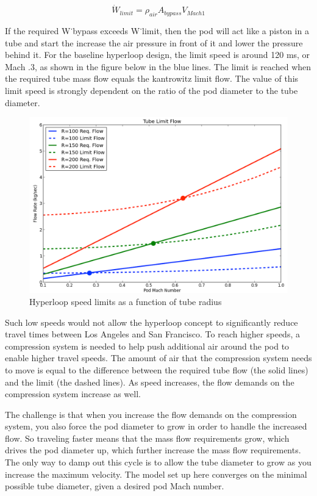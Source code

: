 \documentclass[heading.tex]{subfiles}
\begin{document}
\begin{equation*}
\dot{W}_{limit} = \rho_{air} A_{bypass} V_{Mach 1}
\end{equation*}


If the required W˙bypass exceeds W˙limit, then the pod will act like a piston in a tube and start the increase the air pressure in front of it and lower the pressure behind it. For the baseline hyperloop design, the limit speed is around 120 ms, or Mach .3, as shown in the figure below in the blue lines. The limit is reached when the required tube mass flow equals the kantrowitz limit flow. The value of this limit speed is strongly dependent on the ratio of the pod diameter to the tube diameter.


\begin{figure}[hbtp]
\centering
\includegraphics[scale=0.5]{images/tube_flow_limits.png}
\caption{Hyperloop speed limits as a function of tube radius}
\label{f:flowLIMIT}
\end{figure}

Such low speeds would not allow the hyperloop concept to significantly reduce travel times between Los Angeles and San Francisco. To reach higher speeds, a compression system is needed to help push additional air around the pod to enable higher travel speeds. The amount of air that the compression system needs to move is equal to the difference between the required tube flow (the solid lines) and the limit (the dashed lines). As speed increases, the flow demands on the compression system increase as well.

The challenge is that when you increase the flow demands on the compression system, you also force the pod diameter to grow in order to handle the increased flow. So traveling faster means that the mass flow requirements grow, which drives the pod diameter up, which further increase the mass flow requirements. The only way to damp out this cycle is to allow the tube diameter to grow as you increase the maximum velocity. The model set up here converges on the minimal possible tube diameter, given a desired pod Mach number.
\end{document}
